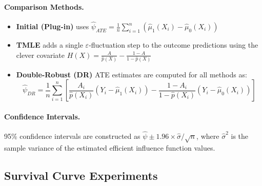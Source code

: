 \documentclass{article}
\theoremstyle{remark}
\begin{document}
\paragraph{Comparison Methods.}
\begin{itemize}[leftmargin=15pt]
\item \textbf{Initial (Plug-in)} uses $\hat{\psi}_{ATE} = \frac{1}{n}\sum_{i=1}^{n}(\hat{\mu}_1(X_i) - \hat{\mu}_0(X_i))$
\item \textbf{TMLE} adds a single $\varepsilon$-fluctuation step to the outcome predictions using the clever covariate $H(X) = \frac{A}{\hat{p}(X)} - \frac{1-A}{1-\hat{p}(X)}$
\item \textbf{Double-Robust (DR)} ATE estimates are computed for all methods as:
$$
\hat{\psi}_{DR} = \frac{1}{n}\sum_{i=1}^{n}\left[ \frac{A_i}{\hat{p}(X_i)}(Y_i - \hat{\mu}_1(X_i)) - \frac{1-A_i}{1-\hat{p}(X_i)}(Y_i - \hat{\mu}_0(X_i))\right]
$$
\end{itemize}
\paragraph{Confidence Intervals.}
95\% confidence intervals are constructed as $\hat{\psi} \pm 1.96 \times \hat{\sigma}/\sqrt{n}$, where $\hat{\sigma}^2$ is the sample variance of the estimated efficient influence function values.

\subsection{Survival Curve Experiments}
\label{sec:Survival set up}
\end{document}
